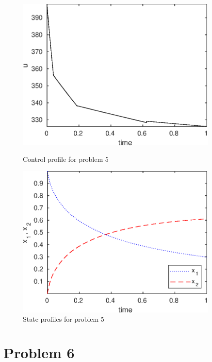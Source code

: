 \begin{figure}[htb]
\begin{minipage}[t]{0.5\linewidth}
\centering
\includegraphics[width=0.9\textwidth]{examples/problem5/graphs/u_524a.eps}
\caption[Problem 5: Control profile]{Control profile for problem 5}
\label{fig:prob5_u}  
\end{minipage}
\begin{minipage}[t]{0.5\linewidth}
\centering
\includegraphics[width=0.9\textwidth]{examples/problem5/graphs/x12_524a.eps}
\caption[Problem 4: State profiles]{State profiles for problem 5}
\label{fig:prob5_x} 
\end{minipage}
\end{figure}

\section{Problem 6}
\label{sec:prob6}


